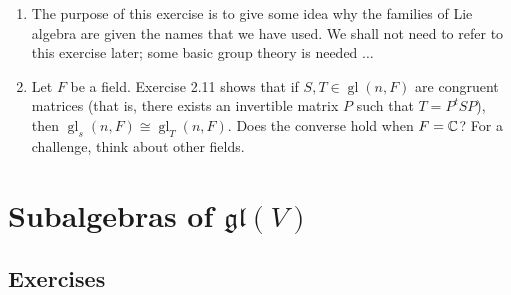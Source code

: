 \documentclass[12pt,a4paper]{report}
\newcommand{\GL}{\operatorname{gl}}
\begin{document}
\begin{enumerate}[label=4.\arabic*]
\item The purpose of this exercise is to give some idea why the families of Lie algebra are given the names that we have used.  We shall not need to refer to this exercise later;  some basic group theory is needed $\dots$

\item Let $F$ be a field.  Exercise 2.11 shows that if $S,T \in \GL(n,F)$ are congruent matrices (that is, there exists an invertible matrix $P$ such that $T=P^tSP$), then $\GL_s(n,F) \cong \GL_T(n,F)$.  Does the converse hold when $F = \mathbb{C}$?  For a challenge, think about other fields.
\end{enumerate}

\chapter{Subalgebras of $\mathfrak{gl}(V)$}

\section{Exercises}
\end{document}
